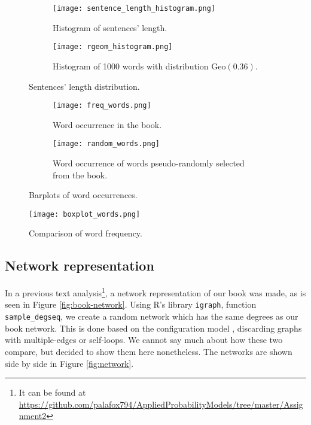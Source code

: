 \documentclass[letterpaper, 10 pt, conference]{article}
\begin{document}
 \begin{figure}
 	\centering
 	\begin{subfigure}[b]{0.45\linewidth}
 		\texttt{[image: sentence\_length\_histogram.png]}
 		\caption{Histogram of sentences' length.}
 		\label{fig:sentences_histogram}
 	\end{subfigure}
 	\begin{subfigure}[b]{0.45\linewidth}
 	\texttt{[image: rgeom\_histogram.png]}
  	\caption{Histogram of 1000 words with distribution $\mathrm{Geo}(0.36)$.}
  	\label{fig:rgeom_hist}
	 \end{subfigure}
  	\caption{Sentences' length distribution.} 
 	\label{fig:histograms}
 \end{figure}


 \begin{figure}
	\centering
	\begin{subfigure}[b]{0.45\linewidth}
		\texttt{[image: freq\_words.png]}
		\caption{Word occurrence in the book.}
		\label{fig:barplot_book}
	\end{subfigure}
	\begin{subfigure}[b]{0.45\linewidth}
		\texttt{[image: random\_words.png]}
		\caption{Word occurrence of words pseudo-randomly selected from the book.}
		\label{fig:barplot_random}
	\end{subfigure}
	\caption{Barplots of word occurrences.} 
	\label{fig:barplots}
\end{figure}

\begin{figure}
\centering
\texttt{[image: boxplot\_words.png]}
\caption{Comparison of word frequency.}
\label{fig:boxplot}
\end{figure}

\subsection{Network representation}
In a previous text analysis\footnote{It can be found at \url{https://github.com/palafox794/AppliedProbabilityModels/tree/master/Assignment2}}, a network representation of our book was made, as is seen in Figure \ref{fig:book-network}. Using R's library \texttt{igraph}, function \texttt{sample\_degseq}, we create a random network which has the same degrees as our book network. This is done based on the configuration model \cite{newman}, discarding graphs with multiple-edges or self-loops. We cannot say much about how these two compare, but decided to show them here nonetheless. The networks are shown side by side in Figure \ref{fig:network}.
\end{document}

